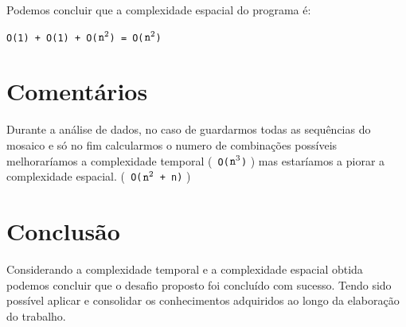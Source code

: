 \documentclass{article}
\begin{document}
Podemos concluir que a complexidade espacial do programa é:
\begin{center}
    \verb|O(1) + O(1) + O(|$\verb|n|^2$\verb|) = O(|$\verb|n|^2$\verb|)| 
\end{center}
\section{Comentários}
Durante a análise de dados, no caso de guardarmos todas as sequências do mosaico e só no fim calcularmos o numero de combinações possíveis melhoraríamos a complexidade temporal (\verb| O(|$\verb|n|^3$\verb|)| ) mas estaríamos a piorar a complexidade espacial.  (\verb| O(|$\verb|n|^2$\verb| + n)| )
\section{Conclusão}
Considerando a complexidade temporal e a complexidade espacial obtida podemos concluir que o desafio proposto foi concluído com sucesso. Tendo sido possível aplicar e consolidar os conhecimentos adquiridos ao longo da elaboração do trabalho.
\end{document}
